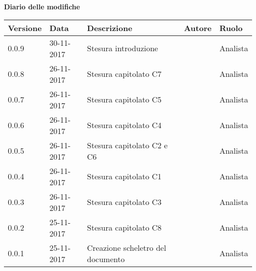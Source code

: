 \documentclass[StudioDiFattibilità.tex]{subfiles}
\begin{document}
\huge \bfseries Diario delle modifiche\\
\begin{table}[htbp]
	\centering
	\renewcommand\arraystretch{1.2}

	\begin{tabularx}{\textwidth}{p{1.6cm}|p{2cm}|p{4cm}|p{3cm}|p{2cm}}
		\hline
		\textbf{Versione} & \textbf{Data} & \textbf{Descrizione} & \textbf{Autore} & \textbf{Ruolo}\\

		\hline
		0.0.9 & 30-11-2017 & Stesura introduzione & \Elena & Analista\\

		\hline
		0.0.8 & 26-11-2017 & Stesura capitolato C7 & \Gianluca & Analista\\

		\hline
		0.0.7 & 26-11-2017 & Stesura capitolato C5 & \Parwinder & Analista\\
		
		\hline
		0.0.6 & 26-11-2017 & Stesura capitolato C4 & \Valentina & Analista\\
		
		\hline
		0.0.5 & 26-11-2017 & Stesura capitolato C2 e C6 & \Mirco & Analista \\

		\hline
		0.0.4 & 26-11-2017 & Stesura capitolato C1 & \Riccardo & Analista \\
		
		\hline
		0.0.3 & 26-11-2017 & Stesura capitolato C3 & \Davide & Analista \\
		
		\hline
		0.0.2 & 25-11-2017 & Stesura capitolato C8 & \Elena & Analista \\
		
		\hline
		0.0.1 & 25-11-2017 & Creazione scheletro del documento & \Valentina & Analista \\
		\hline
	
	\end{tabularx}

\end{table}
\restoregeometry
\end{document}

